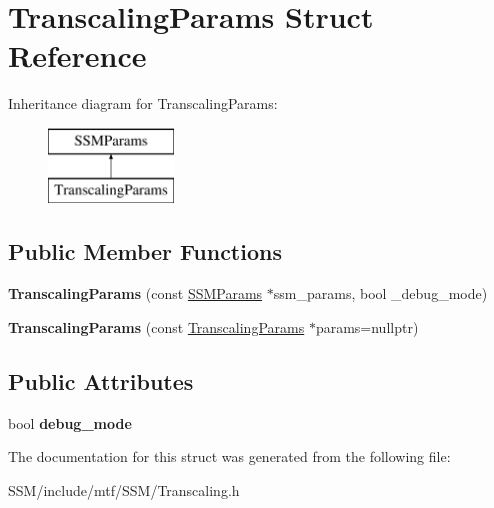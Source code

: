 \hypertarget{structTranscalingParams}{\section{Transcaling\-Params Struct Reference}
\label{structTranscalingParams}
}
Inheritance diagram for Transcaling\-Params\-:\begin{figure}[H]
\begin{center}
\leavevmode
\includegraphics[height=2.000000cm]{structTranscalingParams}
\end{center}
\end{figure}
\subsection*{Public Member Functions}
\begin{DoxyCompactItemize}
\item 
\hypertarget{structTranscalingParams_ae200554a65214e26f88d63bacf3ba105}{{\bfseries Transcaling\-Params} (const \hyperlink{structSSMParams}{S\-S\-M\-Params} $\ast$ssm\-\_\-params, bool \-\_\-debug\-\_\-mode)}\label{structTranscalingParams_ae200554a65214e26f88d63bacf3ba105}

\item 
\hypertarget{structTranscalingParams_a2bdf2f62d8c11016aac878fb0c7e7469}{{\bfseries Transcaling\-Params} (const \hyperlink{structTranscalingParams}{Transcaling\-Params} $\ast$params=nullptr)}\label{structTranscalingParams_a2bdf2f62d8c11016aac878fb0c7e7469}

\end{DoxyCompactItemize}
\subsection*{Public Attributes}
\begin{DoxyCompactItemize}
\item 
\hypertarget{structTranscalingParams_a611269f4a8c9c591a10c3b82ae1e94ae}{bool {\bfseries debug\-\_\-mode}}\label{structTranscalingParams_a611269f4a8c9c591a10c3b82ae1e94ae}

\end{DoxyCompactItemize}


The documentation for this struct was generated from the following file\-:\begin{DoxyCompactItemize}
\item 
S\-S\-M/include/mtf/\-S\-S\-M/Transcaling.\-h\end{DoxyCompactItemize}
